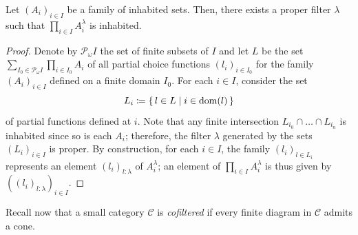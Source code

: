 \begin{lem}\label{lem:choice-up-to-filter}
    Let $(A_i)_{i\in I}$ be a family of inhabited sets. Then, there exists a proper filter $\lambda$ such that $\prod_{i\in I} A_i^\lambda$ is inhabited.
\begin{proof}
    Denote by $\mathcal P_\omega I$ the set of finite subsets of $I$ and let $L$ be the set $\sum_{I_0 \in \mathcal P_\omega I} \prod_{i\in I_0} A_i$ of all partial choice functions $(l_i)_{i\in I_0}$ for the family $(A_i)_{i\in I}$ defined on a finite domain $I_0$. For each $i \in I$, consider the set 
    \[ L_i \coloneqq \set{ l \in L | i \in \operatorname{dom}(l)}\]
    of partial functions defined at $i$. Note that any finite intersection $L_{i_0} \cap \dots \cap L_{i_n}$ is inhabited since so is each $A_i$; therefore, the filter $\lambda$ generated by the sets $(L_i)_{i\in I}$ is proper. By construction, for each $i\in I$, the family $(l_i)_{l\in L_i}$ represents an element $(l_i)_{l:\lambda}$ of $A_i^\lambda$; an element of $\prod_{i\in I} A_i^\lambda$ is thus given by $((l_i)_{l: \lambda})_{i\in I}$.
\end{proof}
\end{lem}

Recall now that a small category $\mathcal C$ is \emph{cofiltered} if every finite diagram in $\mathcal C$ admits a cone.

